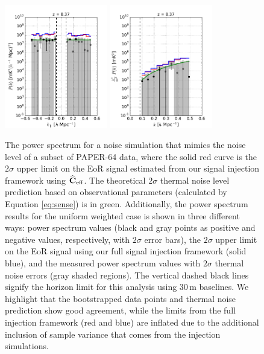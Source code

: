 \documentclass[preprint2,numberedappendix,tighten]{aastex6}  %
\begin{document}
\begin{figure}
	\centering
	\includegraphics[width=0.4\textwidth]{plots/ps1_noise_add.pdf}
	\includegraphics[width=0.4\textwidth]{plots/ps2_noise_add.pdf}
	\caption{The power spectrum for a noise simulation that mimics the noise level of a subset of PAPER-64 data, where the solid red curve is the $2\sigma$ upper limit on the EoR signal estimated from our signal injection framework using $\widehat{\textbf{C}}_{\rm eff}$. The theoretical $2\sigma$ thermal noise level prediction based on observational parameters (calculated by Equation \eqref{eq:sense}) is in green. Additionally, the power spectrum results for the uniform weighted case is shown in three different ways: power spectrum values (black and gray points as positive and negative values, respectively, with $2\sigma$ error bars), the $2\sigma$ upper limit on the EoR signal using our full signal injection framework (solid blue), and the measured power spectrum values with $2\sigma$ thermal noise errors (gray shaded regions). The vertical dashed black lines signify the horizon limit for this analysis using $30$\,m baselines. We highlight that the bootstrapped data points and thermal noise prediction show good agreement, while the limits from the full injection framework (red and blue) are inflated due to the additional inclusion of sample variance that comes from the injection simulations.}
	\label{fig:ps_noise}
\end{figure}
\end{document}
